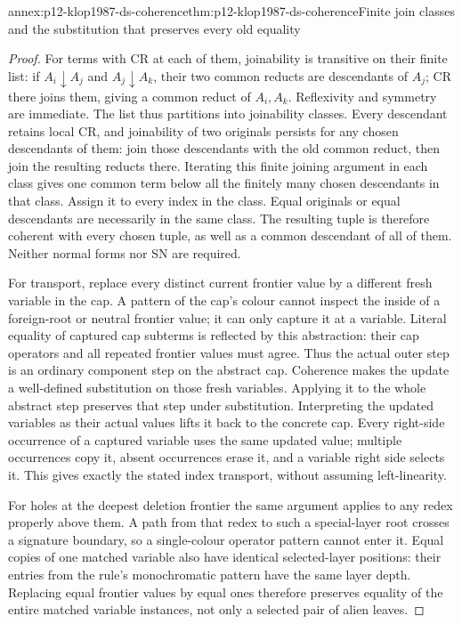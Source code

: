 \begin{annexitem}{annex:p12-klop1987-ds-coherence}{thm:p12-klop1987-ds-coherence}{Finite join classes and the substitution that preserves every old equality}
\begin{proof}
For terms with CR at each of them, joinability is transitive on
their finite list: if \(A_i\downarrow A_j\) and
\(A_j\downarrow A_k\), their two common reducts are descendants
of \(A_j\); CR there joins them, giving a common reduct of
\(A_i,A_k\). Reflexivity and symmetry are immediate. The list
thus partitions into joinability classes. Every descendant retains
local CR, and joinability of two originals persists for any chosen
descendants of them: join those descendants with the old common
reduct, then join the resulting reducts there. Iterating this
finite joining argument in each class gives one common term below
all the finitely many chosen descendants in that class. Assign it
to every index in the class. Equal originals or equal descendants
are necessarily in the same class. The resulting tuple is therefore
coherent with every chosen tuple, as well as a common descendant
of all of them. Neither normal forms nor SN are required.

For transport, replace every distinct current frontier value by a
different fresh variable in the cap. A pattern of the cap's colour
cannot inspect the inside of a foreign-root or neutral frontier
value; it can only capture it at a variable. Literal equality of
captured cap subterms is reflected by this abstraction: their cap
operators and all repeated frontier values must agree. Thus the
actual outer step is an ordinary component step on the abstract cap.
Coherence makes the update a well-defined substitution on those
fresh variables. Applying it to the whole abstract step preserves
that step under substitution. Interpreting the updated variables
as their actual values lifts it back to the concrete cap.
Every right-side occurrence of a captured variable uses the same
updated value; multiple occurrences copy it, absent occurrences
erase it, and a variable right side selects it. This gives exactly
the stated index transport, without assuming left-linearity.

For holes at the deepest deletion frontier the same argument
applies to any redex properly above them. A path from that redex
to such a special-layer root crosses a signature boundary, so a
single-colour operator pattern cannot enter it. Equal copies of
one matched variable also have identical selected-layer positions:
their entries from the rule's monochromatic pattern have the same
layer depth. Replacing equal frontier values by equal ones therefore
preserves equality of the entire matched variable instances, not
only a selected pair of alien leaves.
\end{proof}
\end{annexitem}

